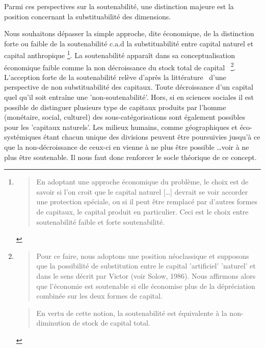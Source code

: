 Parmi ces perspectives sur la soutenabilité, une distinction majeure est la position concernant la substituabilité des dimensions.



Nous souhaitons dépasser la simple approche, dite économique, de la distinction forte ou faible de la soutenabilité c.a.d la substituabilité entre capital naturel et capital anthropique
\footnote{
\blockcquote[traduction]{dietz_weak_2007}{
En adoptant une approche économique du problème, le choix est de savoir si l'on croit que le capital naturel [\dots] devrait se voir accorder une protection spéciale, ou si il peut être remplacé par d'autres formes de capitaux, le capital produit en particulier.
Ceci est le choix entre soutenabilité faible et forte soutenabilité.
}
}.
La soutenabilité apparaît dans sa conceptualisation économique faible comme la non décroissance du stock total de capital~\cite{pearce_capital_1993}
\footnote{
\blockcquote[traduction]{pearce_capital_1993}{
Pour ce faire, nous adoptons une position néoclassique et supposons que la possibilité de substitution entre le capital 'artificiel' 'naturel' et dans le sens décrit par Victor (voir Solow, 1986).
Nous affirmons alors que l'économie est soutenable si elle économise plus de la dépréciation combinée sur les deux formes de capital.
}
\blockcquote[traduction]{cabeza_gutes_concept_1996}{
En vertu de cette notion, la soutenabilité est équivalente à la non-diminution de stock de capital total.
} 
}.
L'acception forte de la soutenabilité relève d'après la littérature~\cite{markandya_dictionary_2001} d'une perspective de non substituabilité des capitaux.
Toute décroissance d'un capital quel qu'il soit entraîne une 'non-soutenabilité'.
Hors, si en sciences sociales il est possible de distinguer plusieurs type de capitaux produits par l'homme (monétaire, social, culturel) des sous-catégorisations sont également possibles pour les 'capitaux naturels'.
Les milieux humains, comme géographiques et éco-systémiques étant chacun unique des divisions peuvent être poursuivies jusqu'à ce que la non-décroissance de ceux-ci en vienne à ne plus être possible \ldots voir à ne plus être soutenable.
Il nous faut donc renforcer le socle théorique de ce concept.

